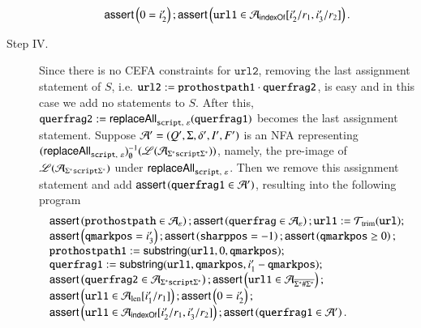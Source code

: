 \begin{description}
\[\begin{array}{l}
		\textsf{assert}\left(0= i'_2\right); \textsf{assert}\left(\mathtt{url1} \in \mathcal{A}_{\mathsf{indexOf}}[i'_2/r_1, i'_3/r_2]\right).
		\end{array}
		\]
		\item[Step IV.] Since there is no CEFA constraints for $\mathtt{url2}$, removing the last assignment statement of $S$, i.e. $\mathtt{url2} := \mathtt{prothostpath1} \cdot \mathtt{querfrag2}$, is easy and in this case we add no statements to $S$. After this, $\mathtt{querfrag2} := \mathsf{replaceAll}_{\mathtt{script},\ \varepsilon}(\mathtt{querfrag1})$ becomes the last assignment statement. Suppose $\mathcal{A}'=(Q', \Sigma, \delta', I', F')$ is an NFA representing $(\mathsf{replaceAll}_{\mathtt{script},\ \varepsilon})^{-1}_\emptyset(\mathscr{L}(\mathcal{A}_{\Sigma^*\mathtt{script}\Sigma^*}))$, namely, the pre-image of $\mathscr{L}(\mathcal{A}_{\Sigma^*\mathtt{script}\Sigma^*})$ under $\mathsf{replaceAll}_{\mathtt{script},\ \varepsilon}$. Then we remove this assignment statement and add $\textsf{assert}\left(\mathtt{querfrag1 \in \mathcal{A}'}\right)$, resulting into the following program
		\[ 
		\begin{array}{l}
		\textsf{assert}\left(\mathtt{prothostpath} \in \mathcal{A}_\varepsilon\right); \textsf{assert}\left(\mathtt{querfrag} \in \mathcal{A}_\varepsilon\right); \mathtt{url1} := \mathcal{T}_{\rm trim}(\mathtt{url}); \\
		\textsf{assert}\left(\mathtt{qmarkpos} = i'_3\right); \textsf{assert}\left(\mathtt{sharppos} =-1 \right); \textsf{assert}\left(\mathtt{qmarkpos} \ge 0\right); \\ 
		\mathtt{prothostpath1} := \mathsf{substring}(\mathtt{url1}, 0, \mathtt{qmarkpos});\\
		\mathtt{querfrag1} := \mathsf{substring}(\mathtt{url1, qmarkpos}, i'_1 - \mathtt{qmarkpos});\\
		\textsf{assert}\left(\mathtt{querfrag2} \in  \mathcal{A}_{\Sigma^*\mathtt{script}\Sigma^*}\right);  
		\textsf{assert}\left(\mathtt{url1} \in  \mathcal{A}_{\overline{\Sigma^*\#\Sigma^*}}\right); \\
		\textsf{assert}\left(\mathtt{url1} \in \mathcal{A}_{\rm len}[i'_1/r_1]\right);  \textsf{assert}\left(0= i'_2\right); \\
		\textsf{assert}\left(\mathtt{url1} \in \mathcal{A}_{\mathsf{indexOf}}[i'_2/r_1, i'_3/r_2]\right);  \textsf{assert}\left(\mathtt{querfrag1} \in \mathcal{A}'\right).
		\end{array}
		\]
		

\end{description}

